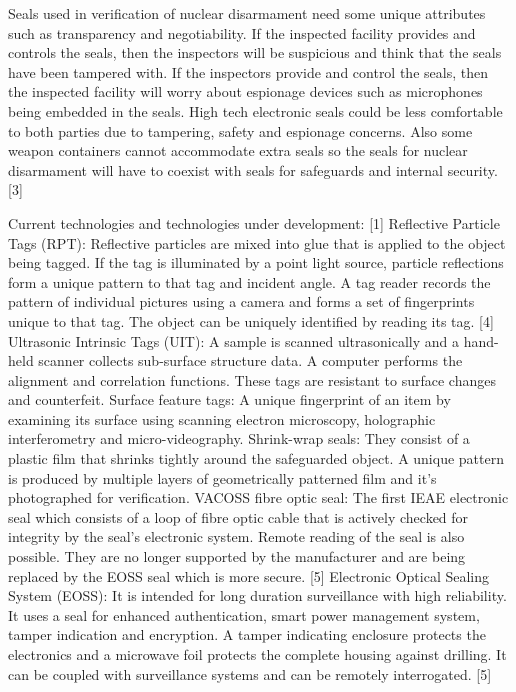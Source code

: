 \documentclass[a4paper]{article}
\begin{document}
Seals used in verification of nuclear disarmament need some unique attributes such as transparency
and negotiability. If the inspected facility provides and controls the seals, then the inspectors will be
suspicious and think that the seals have been tampered with. If the inspectors provide and control
the seals, then the inspected facility will worry about espionage devices such as microphones being
embedded in the seals. High tech electronic seals could be less comfortable to both parties due to
tampering, safety and espionage concerns. Also some weapon containers cannot accommodate
extra seals so the seals for nuclear disarmament will have to coexist with seals for safeguards and
internal security. [3]

Current technologies and technologies under development: [1]
Reflective Particle Tags (RPT): Reflective particles are mixed into glue that is applied to the
object being tagged. If the tag is illuminated by a point light source, particle reflections form a
unique pattern to that tag and incident angle. A tag reader records the pattern of individual
pictures using a camera and forms a set of fingerprints unique to that tag. The object can be
uniquely identified by reading its tag. [4]
Ultrasonic Intrinsic Tags (UIT): A sample is scanned ultrasonically and a hand-held scanner
collects sub-surface structure data. A computer performs the alignment and correlation
functions. These tags are resistant to surface changes and counterfeit.
Surface feature tags: A unique fingerprint of an item by examining its surface using scanning
electron microscopy, holographic interferometry and micro-videography.
Shrink-wrap seals: They consist of a plastic film that shrinks tightly around the safeguarded
object. A unique pattern is produced by multiple layers of geometrically patterned film and it’s
photographed for verification.
VACOSS fibre optic seal: The first IEAE electronic seal which consists of a loop of fibre optic cable
that is actively checked for integrity by the seal’s electronic system. Remote reading of the seal is
also possible. They are no longer supported by the manufacturer and are being replaced by the
EOSS seal which is more secure. [5]
Electronic Optical Sealing System (EOSS): It is intended for long duration surveillance with high
reliability. It uses a seal for enhanced authentication, smart power management system, tamper
indication and encryption. A tamper indicating enclosure protects the electronics and a 
microwave foil protects the complete housing against drilling. It can be coupled with surveillance
systems and can be remotely interrogated. [5]
\end{document}
